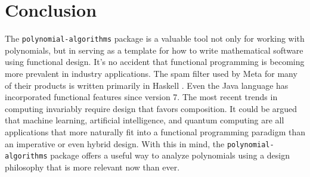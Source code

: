 \documentclass[MS, xcolor=dvipsnames]{wfuthesis}
\theoremstyle{definition}
\begin{document}

\chapter{Conclusion}%
The \lstinline{polynomial-algorithms} package is a valuable tool not only for working with polynomials, but in serving as a template for how to write mathematical software using functional design. It's no accident that functional programming is becoming more prevalent in industry applications. The spam filter used by Meta for many of their products is written primarily in Haskell \cite{Marlow2015}. Even the Java language has incorporated functional features since version 7. The most recent trends in computing invariably require design that favors composition. It could be argued that machine learning, artificial intelligence, and quantum computing are all applications that more naturally fit into a functional programming paradigm than an imperative or even hybrid design. With this in mind, the \lstinline{polynomial-algorithms} package offers a useful way to analyze polynomials using a design philosophy that is more relevant now than ever.





\end{document}
